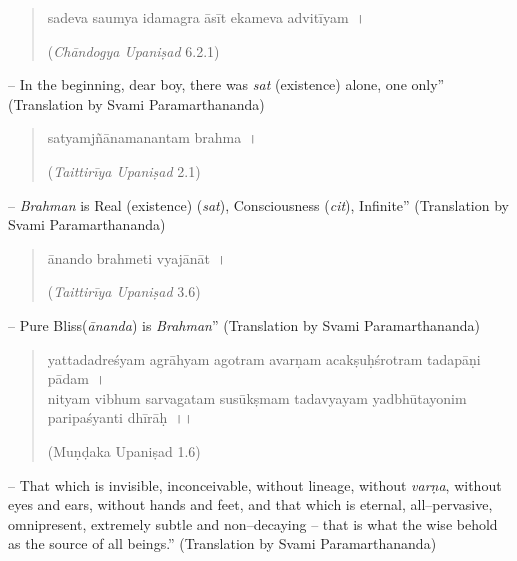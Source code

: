 \begin{verse}
sadeva saumya idamagra āsīt ekameva advitīyam~। 
\begin{flushright}
(\textit{Chāndogya Upaniṣad} 6.2.1)
\end{flushright}
\end{verse}

\begin{myquote}
– In the beginning, dear boy, there was \textit{sat} (existence) alone, one only” (Translation by Svami Paramarthananda)
\end{myquote}

\begin{verse}
satyamjñānamanantam brahma~। 
\begin{flushright}
(\textit{Taittirīya Upaniṣad} 2.1)
\end{flushright}
\end{verse}

\begin{myquote}
– \textit{Brahman} is Real (existence) (\textit{sat}), Consciousness (\textit{cit}), Infinite” (Translation by Svami Paramarthananda)
\end{myquote}

\begin{verse}
ānando brahmeti vyajānāt~। 
\begin{flushright}
(\textit{Taittirīya Upaniṣad} 3.6)
\end{flushright}
\end{verse}

\begin{myquote}
– Pure Bliss(\textit{ānanda}) is \textit{Brahman}” (Translation by Svami Paramarthananda)
\end{myquote}

\begin{verse}
yattadadreśyam agrāhyam agotram avarṇam acakṣuḥśrotram tadapāṇi pādam~।\\ nityam vibhum sarvagatam susūkṣmam tadavyayam yadbhūtayonim paripaśyanti dhīrāḥ~।। 
\begin{flushright}
(Muṇḍaka Upaniṣad 1.6)
\end{flushright}
\end{verse}

\begin{myquote}
– That which is invisible, inconceivable, without lineage, without \textit{varṇa}, without eyes and ears, without hands and feet, and that which is eternal, all–pervasive, omnipresent, extremely subtle and non–decaying – that is what the wise behold as the source of all beings.” (Translation by Svami Paramarthananda)
\end{myquote}

